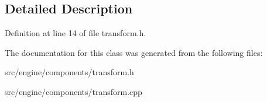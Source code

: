 \subsection{Detailed Description}


Definition at line 14 of file transform.\+h.



The documentation for this class was generated from the following files\+:\begin{DoxyCompactItemize}
\item 
src/engine/components/transform.\+h\item 
src/engine/components/transform.\+cpp\end{DoxyCompactItemize}
